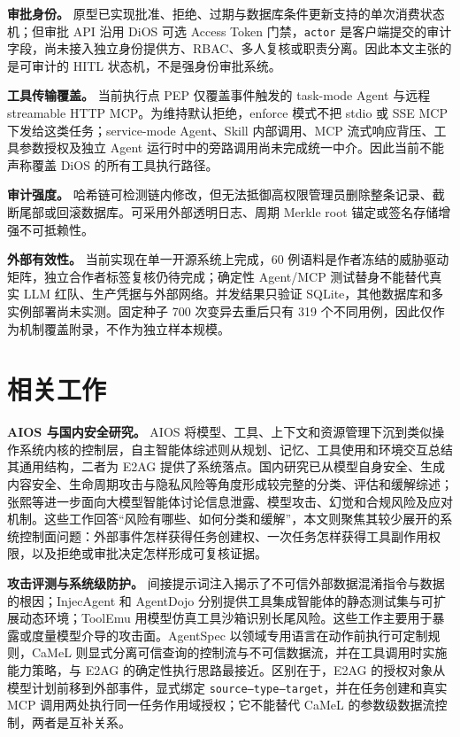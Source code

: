 \textbf{审批身份。} 原型已实现批准、拒绝、过期与数据库条件更新支持的单次消费状态机；但审批 API 沿用 DiOS 可选 Access Token 门禁，\texttt{actor} 是客户端提交的审计字段，尚未接入独立身份提供方、RBAC、多人复核或职责分离。因此本文主张的是可审计的 HITL 状态机，不是强身份审批系统。

\textbf{工具传输覆盖。} 当前执行点 PEP 仅覆盖事件触发的 task-mode Agent 与远程 streamable HTTP MCP。为维持默认拒绝，enforce 模式不把 stdio 或 SSE MCP 下发给这类任务；service-mode Agent、Skill 内部调用、MCP 流式响应背压、工具参数授权及独立 Agent 运行时中的旁路调用尚未完成统一中介。因此当前不能声称覆盖 DiOS 的所有工具执行路径。

\textbf{审计强度。} 哈希链可检测链内修改，但无法抵御高权限管理员删除整条记录、截断尾部或回滚数据库。可采用外部透明日志、周期 Merkle root 锚定或签名存储增强不可抵赖性。

\textbf{外部有效性。} 当前实现在单一开源系统上完成，60 例语料是作者冻结的威胁驱动矩阵，独立合作者标签复核仍待完成；确定性 Agent/MCP 测试替身不能替代真实 LLM 红队、生产凭据与外部网络。并发结果只验证 SQLite，其他数据库和多实例部署尚未实测。固定种子 700 次变异去重后只有 319 个不同用例，因此仅作为机制覆盖附录，不作为独立样本规模。

\section{相关工作}\label{sec:related-work}

\textbf{AIOS 与国内安全研究。} AIOS 将模型、工具、上下文和资源管理下沉到类似操作系统内核的控制层\cite{aios}，自主智能体综述则从规划、记忆、工具使用和环境交互总结其通用结构\cite{agent-survey}，二者为 E2AG 提供了系统落点。国内研究已从模型自身安全、生成内容安全、生命周期攻击与隐私风险等角度形成较完整的分类、评估和缓解综述\cite{huang-llm-safety,mu-llm-security}；张熙等进一步面向大模型智能体讨论信息泄露、模型攻击、幻觉和合规风险及应对机制\cite{zhang-agent-security}。这些工作回答``风险有哪些、如何分类和缓解''，本文则聚焦其较少展开的系统控制面问题：外部事件怎样获得任务创建权、一次任务怎样获得工具副作用权限，以及拒绝或审批决定怎样形成可复核证据。

\textbf{攻击评测与系统级防护。} 间接提示词注入揭示了不可信外部数据混淆指令与数据的根因\cite{indirect-pi}；InjecAgent 和 AgentDojo 分别提供工具集成智能体的静态测试集与可扩展动态环境\cite{injecagent,agentdojo}；ToolEmu 用模型仿真工具沙箱识别长尾风险\cite{toolemu}。这些工作主要用于暴露或度量模型介导的攻击面。AgentSpec 以领域专用语言在动作前执行可定制规则\cite{agentspec}，CaMeL 则显式分离可信查询的控制流与不可信数据流，并在工具调用时实施能力策略\cite{camel}，与 E2AG 的确定性执行思路最接近。区别在于，E2AG 的授权对象从模型计划前移到外部事件，显式绑定 \texttt{source--type--target}，并在任务创建和真实 MCP 调用两处执行同一任务作用域授权；它不能替代 CaMeL 的参数级数据流控制，两者是互补关系。

